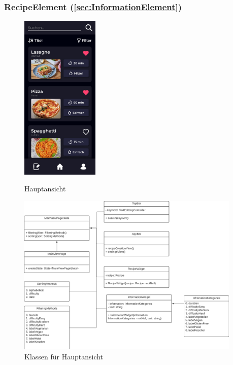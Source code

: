 \documentclass[parskip=full]{scrartcl}
\begin{document}
    \subsubsection*{RecipeElement (\ref{sec:InformationElement})}

    \begin{figure}[htp]
        \begin{minipage}
            [t]{0.49\textwidth}
            \centering
            \includegraphics[height=80mm]{images/Presentation-layer/MainView.jpg}
            \caption{Hauptansicht}
        \end{minipage}
        \begin{minipage}
            [t]{0.49\textwidth}
            \centering
            \includegraphics[width=0.95\textwidth]{images/Presentation-layer/MainViewClass.png}
            \caption{Klassen für Hauptansicht}
        \end{minipage}
    \end{figure}
\end{document}
